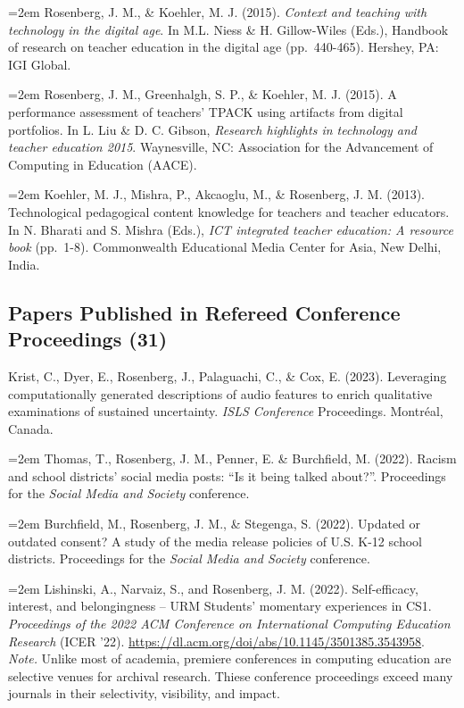 \documentclass[
  14,
]{article}
\begin{document}
\hangindent=2em Rosenberg, J. M., \& Koehler, M. J. (2015).
\emph{Context and teaching with technology in the digital age}. In M.L.
Niess \& H. Gillow-Wiles (Eds.), Handbook of research on teacher
education in the digital age (pp.~440-465). Hershey, PA: IGI Global.

\hangindent=2em Rosenberg, J. M., Greenhalgh, S. P., \& Koehler, M. J.
(2015). A performance assessment of teachers' TPACK using artifacts from
digital portfolios. In L. Liu \& D. C. Gibson, \emph{Research highlights
in technology and teacher education 2015}. Waynesville, NC: Association
for the Advancement of Computing in Education (AACE).

\hangindent=2em Koehler, M. J., Mishra, P., Akcaoglu, M., \& Rosenberg,
J. M. (2013). Technological pedagogical content knowledge for teachers
and teacher educators. In N. Bharati and S. Mishra (Eds.), \emph{ICT
integrated teacher education: A resource book} (pp.~1-8). Commonwealth
Educational Media Center for Asia, New Delhi, India.

\hypertarget{papers-published-in-refereed-conference-proceedings-31}{%
\subsection{Papers Published in Refereed Conference Proceedings
(31)}\label{papers-published-in-refereed-conference-proceedings-31}}

Krist, C., Dyer, E., Rosenberg, J., Palaguachi, C., \& Cox, E. (2023).
Leveraging computationally generated descriptions of audio features to
enrich qualitative examinations of sustained uncertainty. \emph{ISLS
Conference} Proceedings. Montréal, Canada.

\hangindent=2em Thomas, T., Rosenberg, J. M., Penner, E. \& Burchfield,
M. (2022). Racism and school districts' social media posts: ``Is it
being talked about?''. Proceedings for the \emph{Social Media and
Society} conference.

\hangindent=2em Burchfield, M., Rosenberg, J. M., \& Stegenga, S.
(2022). Updated or outdated consent? A study of the media release
policies of U.S. K-12 school districts. Proceedings for the \emph{Social
Media and Society} conference.

\hangindent=2em Lishinski, A., Narvaiz, S., and Rosenberg, J. M. (2022).
Self-efficacy, interest, and belongingness -- URM Students' momentary
experiences in CS1. \emph{Proceedings of the 2022 ACM Conference on
International Computing Education Research} (ICER '22).
\url{https://dl.acm.org/doi/abs/10.1145/3501385.3543958}. \emph{Note.}
Unlike most of academia, premiere conferences in computing education are
selective venues for archival research. Thiese conference proceedings
exceed many journals in their selectivity, visibility, and impact.
\end{document}

